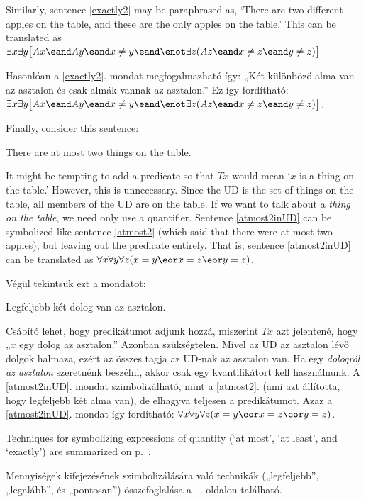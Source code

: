 Similarly, sentence \ref{exactly2} may be paraphrased as, `There are two different apples on the table, and these are the only apples on the table.' This can be translated as $\exists x\exists y\bigl[Ax \eand Ay \eand x\neq y \eand \enot\exists z(Az \eand x\neq z \eand y\neq z)\bigr]$.

Hasonlóan a \ref{exactly2}. mondat megfogalmazható így: „Két különböző alma van az asztalon és csak almák vannak az asztalon.” Ez így fordítható: $\exists x\exists y\bigl[Ax \eand Ay \eand x\neq y \eand \enot\exists z(Az \eand x\neq z \eand y\neq z)\bigr]$.

Finally, consider this sentence:
\begin{earg}
\item[\ex{atmost2inUD}] There are at most two things on the table.
\end{earg}
It might be tempting to add a predicate so that $Tx$ would mean `$x$ is a thing on the table.' However, this is unnecessary. Since the UD is the set of things on the table, all members of the UD are on the table. If we want to talk about a \emph{thing on the table}, we need only use a quantifier. Sentence \ref{atmost2inUD} can be symbolized like sentence \ref{atmost2} (which said that there were at most two apples), but leaving out the predicate entirely. That is, sentence \ref{atmost2inUD} can be translated as $\forall x \forall y \forall z(x=y \eor x=z \eor y=z)$.

Végül tekintsük ezt a mondatot:
\begin{earg}
\item[\ex{atmost2inUD}] Legfeljebb két dolog van az asztalon.
\end{earg}
Csábító lehet, hogy predikátumot adjunk hozzá, miszerint $Tx$ azt jelentené, hogy „$x$ egy dolog az asztalon.” Azonban szükségtelen. Mivel az UD az asztalon lévő dolgok halmaza, ezért az összes tagja az UD-nak az asztalon van. Ha egy \emph{dologról az asztalon} szeretnénk beszélni, akkor csak egy kvantifikátort kell használnunk. A \ref{atmost2inUD}. mondat szimbolizálható, mint a \ref{atmost2}. (ami azt állította, hogy legfeljebb két alma van), de elhagyva teljesen a predikátumot. Azaz a \ref{atmost2inUD}. mondat így fordítható: $\forall x \forall y \forall z(x=y \eor x=z \eor y=z)$.

Techniques for symbolizing expressions of quantity (`at most', `at least', and `exactly') are summarized on p.~\pageref{summary.atleast}.

Mennyiségek kifejezésének szimbolizálására való technikák („legfeljebb”, „legalább”, és „pontosan”) összefoglalása a ~\pageref{summary.atleast}. oldalon található.

